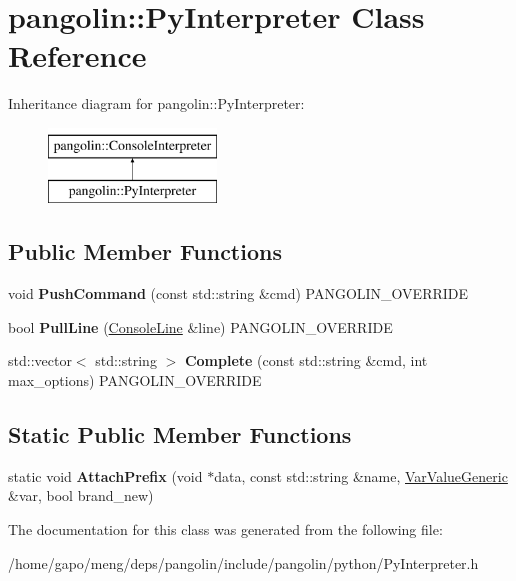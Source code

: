 \hypertarget{classpangolin_1_1_py_interpreter}{}\section{pangolin\+:\+:Py\+Interpreter Class Reference}
\label{classpangolin_1_1_py_interpreter}
Inheritance diagram for pangolin\+:\+:Py\+Interpreter\+:\begin{figure}[H]
\begin{center}
\leavevmode
\includegraphics[height=2.000000cm]{classpangolin_1_1_py_interpreter}
\end{center}
\end{figure}
\subsection*{Public Member Functions}
\begin{DoxyCompactItemize}
\item 
void {\bfseries Push\+Command} (const std\+::string \&cmd) P\+A\+N\+G\+O\+L\+I\+N\+\_\+\+O\+V\+E\+R\+R\+I\+DE\hypertarget{classpangolin_1_1_py_interpreter_ac1428b8e6f708d84e68399f948e76a29}{}\label{classpangolin_1_1_py_interpreter_ac1428b8e6f708d84e68399f948e76a29}

\item 
bool {\bfseries Pull\+Line} (\hyperlink{classpangolin_1_1_console_line}{Console\+Line} \&line) P\+A\+N\+G\+O\+L\+I\+N\+\_\+\+O\+V\+E\+R\+R\+I\+DE\hypertarget{classpangolin_1_1_py_interpreter_ac91f101a3058d12c4f3cb211e8672f44}{}\label{classpangolin_1_1_py_interpreter_ac91f101a3058d12c4f3cb211e8672f44}

\item 
std\+::vector$<$ std\+::string $>$ {\bfseries Complete} (const std\+::string \&cmd, int max\+\_\+options) P\+A\+N\+G\+O\+L\+I\+N\+\_\+\+O\+V\+E\+R\+R\+I\+DE\hypertarget{classpangolin_1_1_py_interpreter_ae92fd82274bced062bfb6763e98ba813}{}\label{classpangolin_1_1_py_interpreter_ae92fd82274bced062bfb6763e98ba813}

\end{DoxyCompactItemize}
\subsection*{Static Public Member Functions}
\begin{DoxyCompactItemize}
\item 
static void {\bfseries Attach\+Prefix} (void $\ast$data, const std\+::string \&name, \hyperlink{classpangolin_1_1_var_value_generic}{Var\+Value\+Generic} \&var, bool brand\+\_\+new)\hypertarget{classpangolin_1_1_py_interpreter_ac53f11816bdc9c90c5d41484feb53c45}{}\label{classpangolin_1_1_py_interpreter_ac53f11816bdc9c90c5d41484feb53c45}

\end{DoxyCompactItemize}


The documentation for this class was generated from the following file\+:\begin{DoxyCompactItemize}
\item 
/home/gapo/meng/deps/pangolin/include/pangolin/python/Py\+Interpreter.\+h\end{DoxyCompactItemize}
